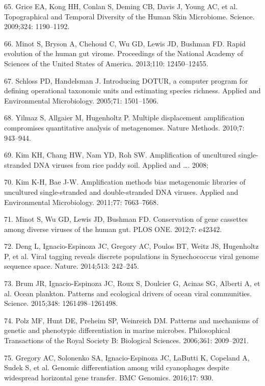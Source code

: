 \documentclass[12pt,]{article}
\begin{document}
\hypertarget{ref-Grice:2009ee}{}
65. Grice EA, Kong HH, Conlan S, Deming CB, Davis J, Young AC, et al.
Topographical and Temporal Diversity of the Human Skin Microbiome.
Science. 2009;324: 1190--1192.

\hypertarget{ref-Minot:2013ih}{}
66. Minot S, Bryson A, Chehoud C, Wu GD, Lewis JD, Bushman FD. Rapid
evolution of the human gut virome. Proceedings of the National Academy
of Sciences of the United States of America. 2013;110: 12450--12455.

\hypertarget{ref-Schloss:2005hz}{}
67. Schloss PD, Handelsman J. Introducing DOTUR, a computer program for
defining operational taxonomic units and estimating species richness.
Applied and Environmental Microbiology. 2005;71: 1501--1506.

\hypertarget{ref-Yilmaz:2010jb}{}
68. Yilmaz S, Allgaier M, Hugenholtz P. Multiple displacement
amplification compromises quantitative analysis of metagenomes. Nature
Methods. 2010;7: 943--944.

\hypertarget{ref-Kim:2008to}{}
69. Kim KH, Chang HW, Nam YD, Roh SW. Amplification of uncultured
single-stranded DNA viruses from rice paddy soil. Applied and \ldots{}.
2008;

\hypertarget{ref-Kim:2011hp}{}
70. Kim K-H, Bae J-W. Amplification methods bias metagenomic libraries
of uncultured single-stranded and double-stranded DNA viruses. Applied
and Environmental Microbiology. 2011;77: 7663--7668.

\hypertarget{ref-Minot:2012ed}{}
71. Minot S, Wu GD, Lewis JD, Bushman FD. Conservation of gene cassettes
among diverse viruses of the human gut. PLOS ONE. 2012;7: e42342.

\hypertarget{ref-Deng:2014eb}{}
72. Deng L, Ignacio-Espinoza JC, Gregory AC, Poulos BT, Weitz JS,
Hugenholtz P, et al. Viral tagging reveals discrete populations in
Synechococcus viral genome sequence space. Nature. 2014;513: 242--245.

\hypertarget{ref-Brum:2015iaa}{}
73. Brum JR, Ignacio-Espinoza JC, Roux S, Doulcier G, Acinas SG, Alberti
A, et al. Ocean plankton. Patterns and ecological drivers of ocean viral
communities. Science. 2015;348: 1261498--1261498.

\hypertarget{ref-Polz:2006fi}{}
74. Polz MF, Hunt DE, Preheim SP, Weinreich DM. Patterns and mechanisms
of genetic and phenotypic differentiation in marine microbes.
Philosophical Transactions of the Royal Society B: Biological Sciences.
2006;361: 2009--2021.

\hypertarget{ref-Gregory:2016cg}{}
75. Gregory AC, Solonenko SA, Ignacio-Espinoza JC, LaButti K, Copeland
A, Sudek S, et al. Genomic differentiation among wild cyanophages
despite widespread horizontal gene transfer. BMC Genomics. 2016;17: 930.
\end{document}
